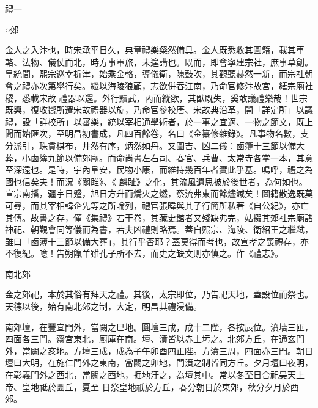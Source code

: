 
\begin{pinyinscope}

 禮一



 ○郊



 金人之入汴也，時宋承平日久，典章禮樂粲然備具。金人既悉收其圖籍，載其車輅、法物、儀仗而北，時方事軍旅，未遑講也。既而，即會寧建宗社，庶事草創。皇統間，熙宗巡幸析津，始乘金輅，導儀衛，陳鼓吹，其觀聽赫然一新，而宗社朝會之禮亦次第舉行矣。繼以海陵狼顧，志欲併吞江南，乃命官修汴故宮，繕宗廟社稷，悉載宋故
 禮器以還。外行黷武，內而縱欲，其猷既失，奚敢議禮樂哉！世宗既興，復收嚮所遷宋故禮器以旋，乃命官參校唐、宋故典沿革，開「詳定所」以議禮，設「詳校所」以審樂，統以宰相通學術者，於一事之宜適、一物之節文，既上聞而始匯次，至明昌初書成，凡四百餘卷，名曰《金纂修雜錄》。凡事物名數，支分派引，珠貫棋布，井然有序，炳然如丹。又圖吉、凶二儀：鹵簿十三節以備大葬，小鹵簿九節以備郊廟。而命尚書左右司、春官、兵曹、太常寺各掌一本，其意至深遠也。是時，宇內阜安，民物小康，而維持幾百年者實此乎基。鳴呼，禮之為國也信矣夫！而況《關雎》、《
 麟趾》之化，其流風遺思被於後世者，為何如也。宣宗南播，疆宇日蹙，旭日方升而爝火之燃，蔡流弗東而餘燼滅矣！圖籍散逸既莫可尋，而其宰相韓企先等之所論列，禮官張暐與其子行簡所私著《自公紀》，亦亡其傳。故書之存，僅《集禮》若干卷，其藏史館者又殘缺弗完，姑掇其郊社宗廟諸神祀、朝覲會同等儀而為書，若夫凶禮則略焉。蓋自熙宗、海陵、衛紹王之繼弒，雖曰「鹵簿十三節以備大葬」，其行乎否耶？蓋莫得而考也，故宣孝之喪禮存，亦不復紀。噫！告朔餼羊雖孔子所不去，而史之缺文則亦慎之。作《禮志》。



 南北郊



 金之郊祀，本於其俗有拜天之禮。其後，太宗即位，乃告祀天地，蓋設位而祭也。天德以後，始有南北郊之制，大定，明昌其禮浸備。



 南郊壇，在豐宜門外，當闕之巳地。圓壇三成，成十二陛，各按辰位。濆墻三匝，四面各三門。齋宮東北，廚庫在南。壇、濆皆以赤土圬之。北郊方丘，在通玄門外，當闕之亥地。方壇三成，成為子午卯酉四正陛。方濆三周，四面亦三門。朝日壇曰大明，在施仁門外之東南，當闕之卯地，門濆之制皆同方丘。夕月壇曰夜明，在彰義門外之西北，當闕之酉地，掘地汙之，為壇其中。常以冬至日合祀昊天上帝、皇地祗於圜丘，夏至
 日祭皇地祇於方丘，春分朝日於東郊，秋分夕月於西郊。




\end{pinyinscope}
